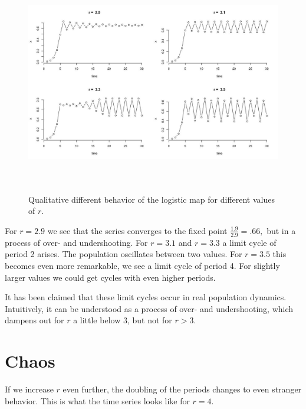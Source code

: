 \documentclass[
  letterpaper,
]{scrbook}
\begin{document}
\begin{figure}

{\centering \includegraphics[width=6.26389in,height=3.84583in]{media/ch2/image4.jpg}

}

\caption{\label{fig-ch2-img4}Qualitative different behavior of the
logistic map for different values of \(r\).}

\end{figure}

For \(r = 2.9\) we see that the series converges to the fixed point
\(\frac{1.9}{2.9} = .66,\) but in a process of over- and undershooting.
For \(r = 3.1\) and \(r = 3.3\) a limit cycle of period 2 arises. The
population oscillates between two values. For \(r = 3.5\) this becomes
even more remarkable, we see a limit cycle of period 4. For slightly
larger values we could get cycles with even higher periods.

It has been claimed that these limit cycles occur in real population
dynamics. Intuitively, it can be understood as a process of over- and
undershooting, which dampens out for \(r\) a little below 3, but not for
\(r > 3\).

\hypertarget{chaos}{%
\section{Chaos}\label{chaos}}

If we increase \(r\) even further, the doubling of the periods changes
to even stranger behavior. This is what the time series looks like for
\(r = 4\).
\end{document}
